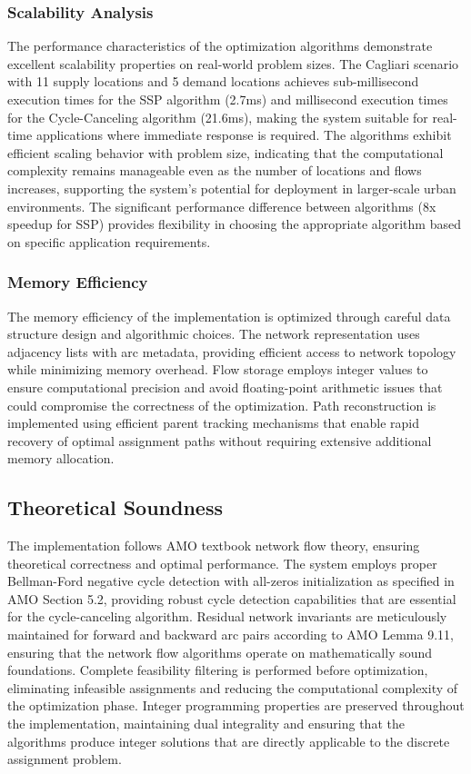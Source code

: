 \documentclass[12pt,a4paper]{article}
\begin{document}
\subsubsection{Scalability Analysis}

The performance characteristics of the optimization algorithms demonstrate excellent scalability properties on real-world problem sizes. The Cagliari scenario with 11 supply locations and 5 demand locations achieves sub-millisecond execution times for the SSP algorithm (2.7ms) and millisecond execution times for the Cycle-Canceling algorithm (21.6ms), making the system suitable for real-time applications where immediate response is required. The algorithms exhibit efficient scaling behavior with problem size, indicating that the computational complexity remains manageable even as the number of locations and flows increases, supporting the system's potential for deployment in larger-scale urban environments. The significant performance difference between algorithms (8x speedup for SSP) provides flexibility in choosing the appropriate algorithm based on specific application requirements.

\subsubsection{Memory Efficiency}

The memory efficiency of the implementation is optimized through careful data structure design and algorithmic choices. The network representation uses adjacency lists with arc metadata, providing efficient access to network topology while minimizing memory overhead. Flow storage employs integer values to ensure computational precision and avoid floating-point arithmetic issues that could compromise the correctness of the optimization. Path reconstruction is implemented using efficient parent tracking mechanisms that enable rapid recovery of optimal assignment paths without requiring extensive additional memory allocation.

\subsection{Theoretical Soundness}

The implementation follows AMO textbook network flow theory, ensuring theoretical correctness and optimal performance. The system employs proper Bellman-Ford negative cycle detection with all-zeros initialization as specified in AMO Section 5.2, providing robust cycle detection capabilities that are essential for the cycle-canceling algorithm. Residual network invariants are meticulously maintained for forward and backward arc pairs according to AMO Lemma 9.11, ensuring that the network flow algorithms operate on mathematically sound foundations. Complete feasibility filtering is performed before optimization, eliminating infeasible assignments and reducing the computational complexity of the optimization phase. Integer programming properties are preserved throughout the implementation, maintaining dual integrality and ensuring that the algorithms produce integer solutions that are directly applicable to the discrete assignment problem.
\end{document}
